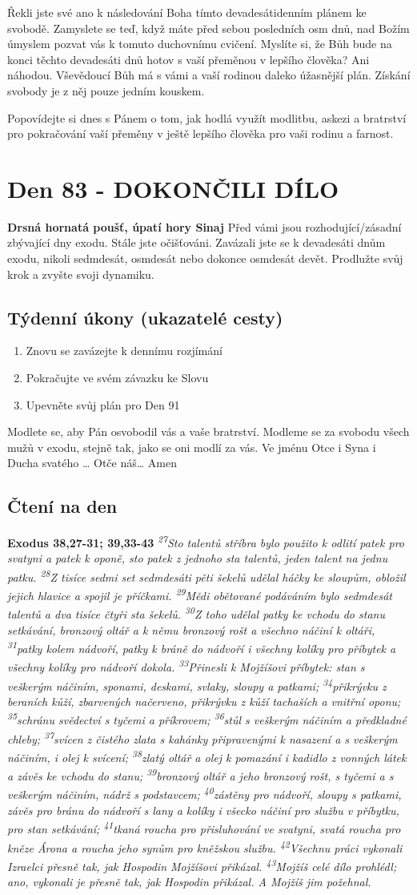 \documentclass[11pt]{article}
\newcommand{\zacatekDvanactyTyden}{
\textbf{Drsná hornatá poušť, úpatí hory Sinaj} \newline 
Před vámi jsou rozhodující/zásadní zbývající dny exodu. Stále jste očišťováni. Zavázali jste se k devadesáti dnům exodu, nikoli sedmdesát, osmdesát nebo dokonce osmdesát devět. Prodlužte svůj krok a zvyšte svoji dynamiku.

\subsection*{Týdenní úkony (ukazatelé cesty)}
\begin{enumerate}
  \item Znovu se zavázejte k dennímu rozjímání
  \item Pokračujte ve svém závazku ke Slovu
  \item Upevněte svůj plán pro Den 91
\end{enumerate}
Modlete se, aby Pán osvobodil vás a vaše bratrství. \newline
Modleme se za svobodu všech mužů v exodu, stejně tak, jako se oni modlí za vás.\newline
Ve jménu Otce i Syna i Ducha svatého …  Otče náš… Amen
}
\begin{document}
Řekli jste své ano k následování Boha tímto devadesátidenním plánem ke svobodě. Zamyslete se teď, když máte před
sebou posledních osm dnů, nad Božím úmyslem pozvat vás k tomuto duchovnímu cvičení. Myslíte si, že Bůh bude na
konci těchto devadesáti dnů hotov s vaší přeměnou v lepšího člověka? Ani náhodou. Vševědoucí Bůh má s vámi a vaší
rodinou daleko úžasnější plán. Získání svobody je z něj pouze jedním kouskem.

Popovídejte si dnes s Pánem o tom, jak hodlá využít modlitbu, askezi a bratrství pro pokračování vaší přeměny v ještě
lepšího člověka pro vaši rodinu a farnost.


\newpage
\section{Den 83 - DOKONČILI DÍLO}
\zacatekDvanactyTyden
\subsection*{Čtení na den}
\textbf{Exodus 38,27-31; 39,33-43}
\newline
\textit{
\textsuperscript{27}Sto talentů stříbra bylo použito k odlití patek pro svatyni a patek k oponě, sto patek z jednoho sta talentů, jeden talent na jednu patku.
\textsuperscript{28}Z tisíce sedmi set sedmdesáti pěti šekelů udělal háčky ke sloupům, obložil jejich hlavice a spojil je příčkami.
\textsuperscript{29}Mědi obětované podáváním bylo sedmdesát talentů a dva tisíce čtyři sta šekelů.
\textsuperscript{30}Z toho udělal patky ke vchodu do stanu setkávání, bronzový oltář a k němu bronzový rošt a všechno náčiní k oltáři,
\textsuperscript{31}patky kolem nádvoří, patky k bráně do nádvoří i všechny kolíky pro příbytek a všechny kolíky pro nádvoří dokola.
\newline
\newline
\textsuperscript{33}Přinesli k Mojžíšovi příbytek: stan s veškerým náčiním, sponami, deskami, svlaky, sloupy a patkami;
\textsuperscript{34}přikrývku z beraních kůží, zbarvených načerveno, přikrývku z kůží tachaších a vnitřní oponu;
\textsuperscript{35}schránu svědectví s tyčemi a příkrovem;
\textsuperscript{36}stůl s veškerým náčiním a předkladné chleby;
\textsuperscript{37}svícen z čistého zlata s kahánky připravenými k nasazení a s veškerým náčiním, i olej k svícení;
\textsuperscript{38}zlatý oltář a olej k pomazání i kadidlo z vonných látek a závěs ke vchodu do stanu;
\textsuperscript{39}bronzový oltář a jeho bronzový rošt, s tyčemi a s veškerým náčiním, nádrž s podstavcem;
\textsuperscript{40}zástěny pro nádvoří, sloupy s patkami, závěs pro bránu do nádvoří s lany a kolíky i všecko náčiní pro službu v příbytku, pro stan setkávání;
\textsuperscript{41}tkaná roucha pro přisluhování ve svatyni, svatá roucha pro kněze Árona a roucha jeho synům pro kněžskou službu.
\textsuperscript{42}Všechnu práci vykonali Izraelci přesně tak, jak Hospodin Mojžíšovi přikázal.
\textsuperscript{43}Mojžíš celé dílo prohlédl; ano, vykonali je přesně tak, jak Hospodin přikázal. A Mojžíš jim požehnal.
}
\end{document}
